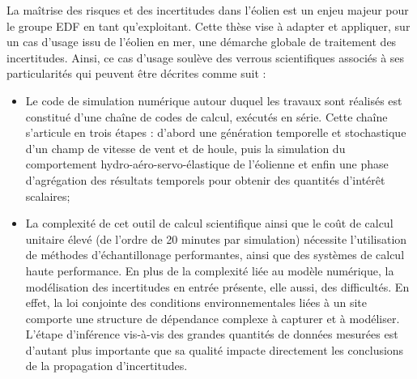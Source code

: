 La maîtrise des risques et des incertitudes dans l'\'{e}olien est un enjeu majeur pour le groupe EDF en tant qu'exploitant. 
Cette thèse vise à adapter et appliquer, sur un cas d'usage issu de l'\'{e}olien en mer, une d\'{e}marche globale de traitement des incertitudes. 
Ainsi, ce cas d'usage soulève des verrous scientifiques associ\'{e}s à ses particularit\'{e}s qui peuvent être d\'{e}crites comme suit :
\begin{itemize}
    \item[\textbullet] 
    Le code de simulation num\'{e}rique autour duquel les travaux sont r\'{e}alis\'{e}s est constitu\'{e} d'une chaîne de codes de calcul, ex\'{e}cut\'{e}s en s\'{e}rie. 
    Cette chaîne s'articule en trois \'{e}tapes : d'abord une g\'{e}n\'{e}ration temporelle et stochastique d'un champ de vitesse de vent et de houle, puis la simulation du comportement hydro-a\'{e}ro-servo-\'{e}lastique de l'\'{e}olienne et enfin une phase d'agr\'{e}gation des r\'{e}sultats temporels pour obtenir des quantit\'{e}s d'int\'{e}rêt scalaires;
    \item[\textbullet] 
    La complexit\'{e} de cet outil de calcul scientifique ainsi que le coût de calcul unitaire \'{e}lev\'{e} (de l'ordre de 20 minutes par simulation) n\'{e}cessite l'utilisation de m\'{e}thodes d'\'{e}chantillonage performantes, ainsi que des systèmes de calcul haute performance. 
    En plus de la complexit\'{e} li\'{e}e au modèle num\'{e}rique, la mod\'{e}lisation des incertitudes en entr\'{e}e pr\'{e}sente, elle aussi, des difficult\'{e}s. 
    En effet, la loi conjointe des conditions environnementales li\'{e}es à un site comporte une structure de d\'{e}pendance complexe à capturer et à mod\'{e}liser. 
    L'\'{e}tape d'inf\'{e}rence vis-à-vis des grandes quantit\'{e}s de donn\'{e}es mesur\'{e}es est d'autant plus importante que sa qualit\'{e} impacte directement les conclusions de la propagation d'incertitudes.
\end{itemize}

